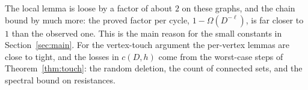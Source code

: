 The local lemma is loose by a factor of about $2$ on these graphs, and the chain bound by much more: the proved factor per cycle, $1-\Omega(D^{-\ell})$, is far closer to $1$ than the observed one. This is the main reason for the small constants in Section~\ref{sec:main}. For the vertex-touch argument the per-vertex lemmas are close to tight, and the losses in $c(D,h)$ come from the worst-case steps of Theorem~\ref{thm:touch}: the random deletion, the count of connected sets, and the spectral bound on resistances.
